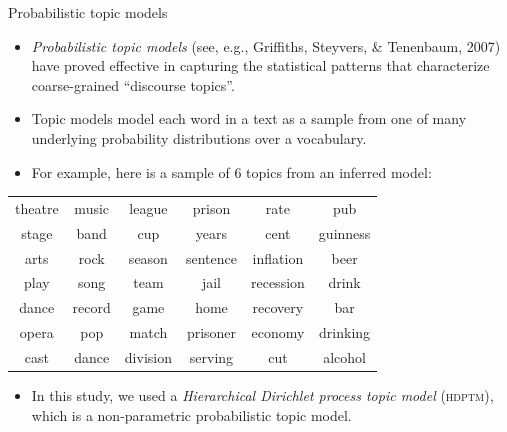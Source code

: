\documentclass[10pt,ignorenonframetext,]{beamer}
\providecommand{\tightlist}{%
  \setlength{\itemsep}{0pt}\setlength{\parskip}{0pt}}
\newcommand{\hdpmm}{\textsc{hdptm}\xspace}
\begin{document}
\begin{frame}{Probabilistic topic models}
\protect\hypertarget{probabilistic-topic-models}{}

\begin{itemize}
\tightlist
\item
  \emph{Probabilistic topic models} (see, e.g., Griffiths, Steyvers, \&
  Tenenbaum, 2007) have proved effective in capturing the statistical
  patterns that characterize coarse-grained ``discourse topics''.
\item
  Topic models model each word in a text as a sample from one of many
  underlying probability distributions over a vocabulary.
\item
  For example, here is a sample of 6 topics from an inferred model:
\end{itemize}

\centering\small 
\begin{tabular}{cccccc}
theatre &    music &  league & prison & rate & pub           \\
stage &      band &   cup & years & cent & guinness          \\
arts &       rock &   season & sentence & inflation & beer \\
play &       song &   team & jail & recession & drink        \\
dance &      record & game & home & recovery & bar           \\
opera &      pop &    match & prisoner & economy & drinking  \\
cast &       dance &  division & serving & cut & alcohol     \\
\end{tabular}\normalsize

\begin{itemize}
\tightlist
\item
  In this study, we used a \emph{Hierarchical Dirichlet process topic
  model} (\hdpmm), which is a non-parametric probabilistic topic model.
\end{itemize}

\end{frame}
\end{document}
